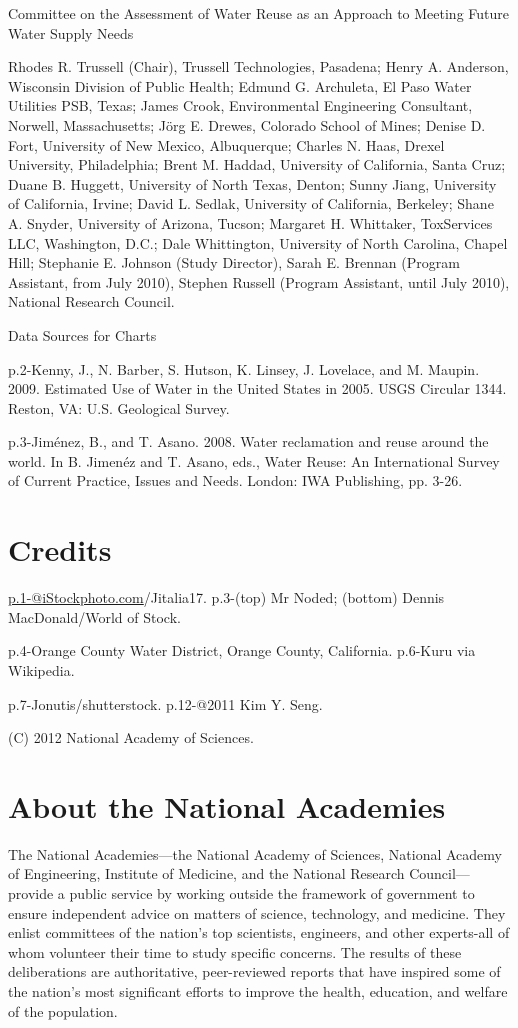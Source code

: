 \documentclass[10pt]{article}
\begin{document}
Committee on the Assessment of Water Reuse as an Approach to Meeting Future Water Supply Needs

Rhodes R. Trussell (Chair), Trussell Technologies, Pasadena; Henry A. Anderson, Wisconsin Division of Public Health; Edmund G. Archuleta, El Paso Water Utilities PSB, Texas; James Crook, Environmental Engineering Consultant, Norwell, Massachusetts; Jörg E. Drewes, Colorado School of Mines; Denise D. Fort, University of New Mexico, Albuquerque; Charles N. Haas, Drexel University, Philadelphia; Brent M. Haddad, University of California, Santa Cruz; Duane B. Huggett, University of North Texas, Denton; Sunny Jiang, University of California, Irvine; David L. Sedlak, University of California, Berkeley; Shane A. Snyder, University of Arizona, Tucson; Margaret H. Whittaker, ToxServices LLC, Washington, D.C.; Dale Whittington, University of North Carolina, Chapel Hill; Stephanie E. Johnson (Study Director), Sarah E. Brennan (Program Assistant, from July 2010), Stephen Russell (Program Assistant, until July 2010), National Research Council.

Data Sources for Charts

p.2-Kenny, J., N. Barber, S. Hutson, K. Linsey, J. Lovelace, and M. Maupin. 2009. Estimated Use of Water in the United States in 2005. USGS Circular 1344. Reston, VA: U.S. Geological Survey.

p.3-Jiménez, B., and T. Asano. 2008. Water reclamation and reuse around the world. In B. Jimenéz and T. Asano, eds., Water Reuse: An International Survey of Current Practice, Issues and Needs. London: IWA Publishing, pp. 3-26.

\section{Credits}
\href{mailto:p.1-@iStockphoto.com}{p.1-@iStockphoto.com}/Jitalia17. p.3-(top) Mr Noded; (bottom) Dennis MacDonald/World of Stock.

p.4-Orange County Water District, Orange County, California. p.6-Kuru via Wikipedia.

p.7-Jonutis/shutterstock. p.12-@2011 Kim Y. Seng.

(C) 2012 National Academy of Sciences.

\section{About the National Academies}
The National Academies—the National Academy of Sciences, National Academy of Engineering, Institute of Medicine, and the National Research Council—provide a public service by working outside the framework of government to ensure independent advice on matters of science, technology, and medicine. They enlist committees of the nation's top scientists, engineers, and other experts-all of whom volunteer their time to study specific concerns. The results of these deliberations are authoritative, peer-reviewed reports that have inspired some of the nation's most significant efforts to improve the health, education, and welfare of the population.
\end{document}
